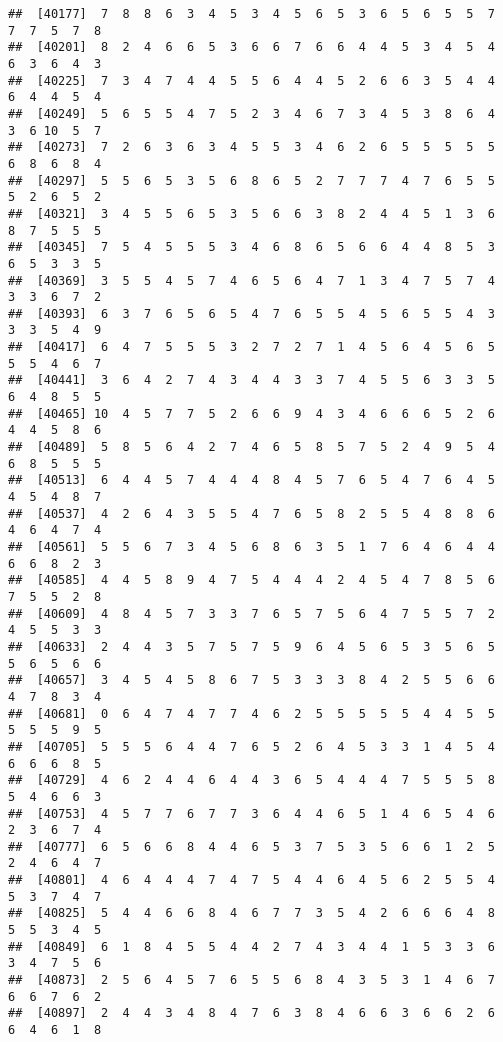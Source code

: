 \documentclass[
]{book}
\begin{document}
\begin{verbatim}
##  [40177]  7  8  8  6  3  4  5  3  4  5  6  5  3  6  5  6  5  5  7  7  7  5  7  8
##  [40201]  8  2  4  6  6  5  3  6  6  7  6  6  4  4  5  3  4  5  4  6  3  6  4  3
##  [40225]  7  3  4  7  4  4  5  5  6  4  4  5  2  6  6  3  5  4  4  6  4  4  5  4
##  [40249]  5  6  5  5  4  7  5  2  3  4  6  7  3  4  5  3  8  6  4  3  6 10  5  7
##  [40273]  7  2  6  3  6  3  4  5  5  3  4  6  2  6  5  5  5  5  5  6  8  6  8  4
##  [40297]  5  5  6  5  3  5  6  8  6  5  2  7  7  7  4  7  6  5  5  5  2  6  5  2
##  [40321]  3  4  5  5  6  5  3  5  6  6  3  8  2  4  4  5  1  3  6  8  7  5  5  5
##  [40345]  7  5  4  5  5  5  3  4  6  8  6  5  6  6  4  4  8  5  3  6  5  3  3  5
##  [40369]  3  5  5  4  5  7  4  6  5  6  4  7  1  3  4  7  5  7  4  3  3  6  7  2
##  [40393]  6  3  7  6  5  6  5  4  7  6  5  5  4  5  6  5  5  4  3  3  3  5  4  9
##  [40417]  6  4  7  5  5  5  3  2  7  2  7  1  4  5  6  4  5  6  5  5  5  4  6  7
##  [40441]  3  6  4  2  7  4  3  4  4  3  3  7  4  5  5  6  3  3  5  6  4  8  5  5
##  [40465] 10  4  5  7  7  5  2  6  6  9  4  3  4  6  6  6  5  2  6  4  4  5  8  6
##  [40489]  5  8  5  6  4  2  7  4  6  5  8  5  7  5  2  4  9  5  4  6  8  5  5  5
##  [40513]  6  4  4  5  7  4  4  4  8  4  5  7  6  5  4  7  6  4  5  4  5  4  8  7
##  [40537]  4  2  6  4  3  5  5  4  7  6  5  8  2  5  5  4  8  8  6  4  6  4  7  4
##  [40561]  5  5  6  7  3  4  5  6  8  6  3  5  1  7  6  4  6  4  4  6  6  8  2  3
##  [40585]  4  4  5  8  9  4  7  5  4  4  4  2  4  5  4  7  8  5  6  7  5  5  2  8
##  [40609]  4  8  4  5  7  3  3  7  6  5  7  5  6  4  7  5  5  7  2  4  5  5  3  3
##  [40633]  2  4  4  3  5  7  5  7  5  9  6  4  5  6  5  3  5  6  5  5  6  5  6  6
##  [40657]  3  4  5  4  5  8  6  7  5  3  3  3  8  4  2  5  5  6  6  4  7  8  3  4
##  [40681]  0  6  4  7  4  7  7  4  6  2  5  5  5  5  5  4  4  5  5  5  5  5  9  5
##  [40705]  5  5  5  6  4  4  7  6  5  2  6  4  5  3  3  1  4  5  4  6  6  6  8  5
##  [40729]  4  6  2  4  4  6  4  4  3  6  5  4  4  4  7  5  5  5  8  5  4  6  6  3
##  [40753]  4  5  7  7  6  7  7  3  6  4  4  6  5  1  4  6  5  4  6  2  3  6  7  4
##  [40777]  6  5  6  6  8  4  4  6  5  3  7  5  3  5  6  6  1  2  5  2  4  6  4  7
##  [40801]  4  6  4  4  4  7  4  7  5  4  4  6  4  5  6  2  5  5  4  5  3  7  4  7
##  [40825]  5  4  4  6  6  8  4  6  7  7  3  5  4  2  6  6  6  4  8  5  5  3  4  5
##  [40849]  6  1  8  4  5  5  4  4  2  7  4  3  4  4  1  5  3  3  6  3  4  7  5  6
##  [40873]  2  5  6  4  5  7  6  5  5  6  8  4  3  5  3  1  4  6  7  6  6  7  6  2
##  [40897]  2  4  4  3  4  8  4  7  6  3  8  4  6  6  3  6  6  2  6  6  4  6  1  8

\end{verbatim}
\end{document}
